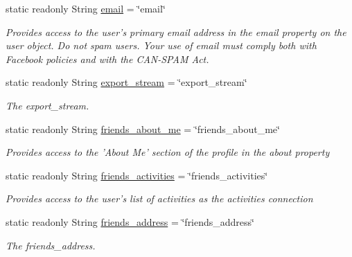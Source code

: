 \begin{DoxyCompactItemize}
static readonly String \hyperlink{classcom_1_1shephertz_1_1app42_1_1paas_1_1sdk_1_1csharp_1_1social_1_1_f_b_perms_a2f53c88b1fba56a51f956afd0b84b7aa}{email} = \char`\"{}email\char`\"{}
\begin{DoxyCompactList}\small\item\em Provides access to the user's primary email address in the email property on the user object. Do not spam users. Your use of email must comply both with Facebook policies and with the C\+A\+N-\/\+S\+P\+A\+M Act. \end{DoxyCompactList}\item 
static readonly String \hyperlink{classcom_1_1shephertz_1_1app42_1_1paas_1_1sdk_1_1csharp_1_1social_1_1_f_b_perms_ad850fb5a237f39159f6eac38d3c0e9d6}{export\+\_\+stream} = \char`\"{}export\+\_\+stream\char`\"{}
\begin{DoxyCompactList}\small\item\em The export\+\_\+stream. \end{DoxyCompactList}\item 
static readonly String \hyperlink{classcom_1_1shephertz_1_1app42_1_1paas_1_1sdk_1_1csharp_1_1social_1_1_f_b_perms_a18531647630e04937ac3fd7d0f5876e7}{friends\+\_\+about\+\_\+me} = \char`\"{}friends\+\_\+about\+\_\+me\char`\"{}
\begin{DoxyCompactList}\small\item\em Provides access to the 'About Me' section of the profile in the about property \end{DoxyCompactList}\item 
static readonly String \hyperlink{classcom_1_1shephertz_1_1app42_1_1paas_1_1sdk_1_1csharp_1_1social_1_1_f_b_perms_adc8673242ebbcff0f99ef552fdc83755}{friends\+\_\+activities} = \char`\"{}friends\+\_\+activities\char`\"{}
\begin{DoxyCompactList}\small\item\em Provides access to the user's list of activities as the activities connection \end{DoxyCompactList}\item 
static readonly String \hyperlink{classcom_1_1shephertz_1_1app42_1_1paas_1_1sdk_1_1csharp_1_1social_1_1_f_b_perms_ab11486ef7c4a0898e099698e6fcf1e85}{friends\+\_\+address} = \char`\"{}friends\+\_\+address\char`\"{}
\begin{DoxyCompactList}\small\item\em The friends\+\_\+address. \end{DoxyCompactList}\item 

\end{DoxyCompactItemize}
